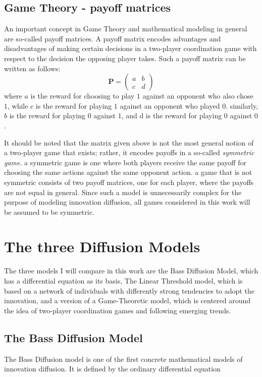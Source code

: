 \documentclass[11pt]{article}
\begin{document}
	\subsection{Game Theory - payoff matrices} \label{sec:payoff}
	An important concept in Game Theory and mathematical modeling in general are so-called payoff matrices. A payoff matrix encodes advantages and disadvantages of making certain decisions in a two-player coordination game with respect to the decision the opposing player takes. Such a payoff matrix can be written as follows:
	$$\mathbf{P} = 
	\begin{pmatrix} 
		a & b \\
		c & d
	\end{pmatrix}$$
	where $a$ is the reward for choosing to play $1$ against an opponent who also chose $1$, while $c$ is the reward for playing $1$ against an opponent who played $0$. similarly, $b$ is the reward for playing $0$ against $1$, and d is the reward for playing $0$ against $0$. 
	
	It should be noted that the matrix given above is not the most general notion of a two-player game that exists; rather, it encodes payoffs in a so-called \textit{symmetric game}. a symmetric game is one where both players receive the same payoff for choosing the same actions against the same opponent action. a game that is not symmetric consists of two payoff matrices, one for each player, where the payoffs are not equal in general. Since such a model is unnecessarily complex for the purpose of modeling innovation diffusion, all games considered in this work will be assumed to be symmetric.
	
	\section{The three Diffusion Models}
	The three models I will compare in this work are the Bass Diffusion Model, which has a differential equation as its basis, The Linear Threshold model, which is based on a network of individuals with differently strong tendencies to adopt the innovation, and a version of a Game-Theoretic model, which is centered around the idea of two-player coordination games and following emerging trends.
	
	\subsection{The Bass Diffusion Model} \label{sec:BassModel}
	The Bass Diffusion model is one of the first concrete mathematical models of innovation diffusion. It is defined by the ordinary differential equation
	
\end{document}
